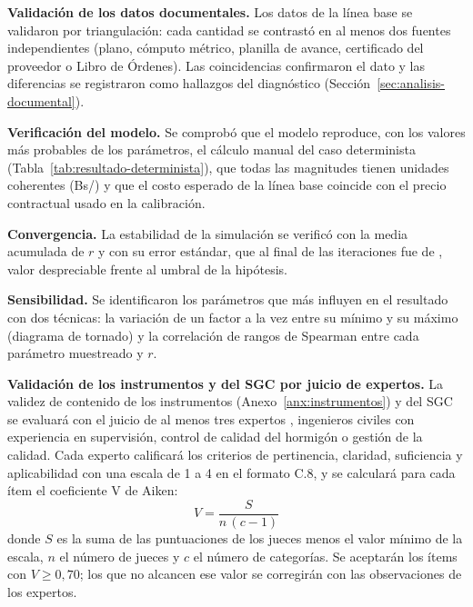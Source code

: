 \textbf{Validación de los datos documentales.} Los datos de la línea base se validaron por triangulación: cada cantidad se contrastó en al menos dos fuentes independientes (plano, cómputo métrico, planilla de avance, certificado del proveedor o Libro de Órdenes). Las coincidencias confirmaron el dato y las diferencias se registraron como hallazgos del diagnóstico (Sección~\ref{sec:analisis-documental}).

\textbf{Verificación del modelo.} Se comprobó que el modelo reproduce, con los valores más probables de los parámetros, el cálculo manual del caso determinista (Tabla~\ref{tab:resultado-determinista}), que todas las magnitudes tienen unidades coherentes (Bs/\mdos{}) y que el costo esperado de la línea base coincide con el precio contractual usado en la calibración.

\textbf{Convergencia.} La estabilidad de la simulación se verificó con la media acumulada de $r$ y con su error estándar, que al final de las \MCiter{} iteraciones fue de \SEr{}, valor despreciable frente al umbral de la hipótesis.

\textbf{Sensibilidad.} Se identificaron los parámetros que más influyen en el resultado con dos técnicas: la variación de un factor a la vez entre su mínimo y su máximo (diagrama de tornado) y la correlación de rangos de Spearman entre cada parámetro muestreado y $r$.

\textbf{Validación de los instrumentos y del SGC por juicio de expertos.} La validez de contenido de los instrumentos (Anexo~\ref{anx:instrumentos}) y del SGC se evaluará con el juicio de al menos tres expertos \parencite[pp.~230, 235]{hernandez2018}, ingenieros civiles con experiencia en supervisión, control de calidad del hormigón o gestión de la calidad. Cada experto calificará los criterios de pertinencia, claridad, suficiencia y aplicabilidad con una escala de 1 a 4 en el formato C.8, y se calculará para cada ítem el coeficiente V de Aiken:
\begin{equation}
  V = \frac{S}{n\,(c-1)}
  \label{eq:aiken}
\end{equation}
donde $S$ es la suma de las puntuaciones de los jueces menos el valor mínimo de la escala, $n$ el número de jueces y $c$ el número de categorías. Se aceptarán los ítems con $V \geq 0{,}70$; los que no alcancen ese valor se corregirán con las observaciones de los expertos. 

